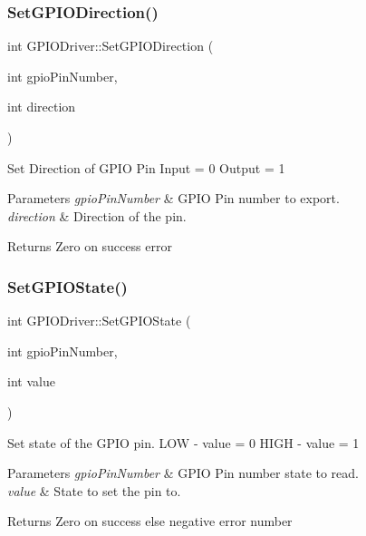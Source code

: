 \subsubsection{\texorpdfstring{Set\+G\+P\+I\+O\+Direction()}{SetGPIODirection()}}
{\footnotesize\ttfamily int G\+P\+I\+O\+Driver\+::\+Set\+G\+P\+I\+O\+Direction (\begin{DoxyParamCaption}\item[{int}]{gpio\+Pin\+Number,  }\item[{int}]{direction }\end{DoxyParamCaption})\hspace{0.3cm}{\ttfamily [private]}}

Set Direction of G\+P\+IO Pin Input = 0 Output = 1


\begin{DoxyParams}{Parameters}
{\em gpio\+Pin\+Number} & G\+P\+IO Pin number to export. \\
\hline
{\em direction} & Direction of the pin.\\
\hline
\end{DoxyParams}
\begin{DoxyReturn}{Returns}
Zero on success error 
\end{DoxyReturn}
\mbox{\label{classGPIODriver_a32a483cec3179d1d13acb1dad37b21ad}} 
\subsubsection{\texorpdfstring{Set\+G\+P\+I\+O\+State()}{SetGPIOState()}}
{\footnotesize\ttfamily int G\+P\+I\+O\+Driver\+::\+Set\+G\+P\+I\+O\+State (\begin{DoxyParamCaption}\item[{int}]{gpio\+Pin\+Number,  }\item[{int}]{value }\end{DoxyParamCaption})}

Set state of the G\+P\+IO pin. L\+OW -\/ value = 0 H\+I\+GH -\/ value = 1


\begin{DoxyParams}{Parameters}
{\em gpio\+Pin\+Number} & G\+P\+IO Pin number state to read. \\
\hline
{\em value} & State to set the pin to.\\
\hline
\end{DoxyParams}
\begin{DoxyReturn}{Returns}
Zero on success else negative error number 
\end{DoxyReturn}
\mbox{\label{classGPIODriver_a314ce5622d8049f62b662b62fd3debe7}} 
